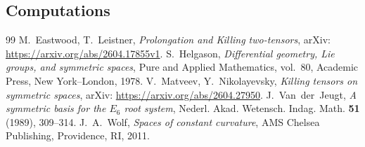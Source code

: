 \documentclass[10pt,a4paper]{amsart}
\newcommand \<{\langle}
\renewcommand \>{\rangle}
\begin{document}
	\subsection{Computations}
	\label{ss:sage}


\begin{thebibliography}{99}
 M.~Eastwood, T.~Leistner, \emph{Prolongation and Killing two-tensors}, arXiv: \url{https://arxiv.org/abs/2604.17855v1}.
 S.~Helgason, \emph{Differential geometry, Lie groups, and symmetric spaces}, Pure and Applied Mathematics, vol.~80, Academic Press, New York--London, 1978.
 V.~Matveev, Y.~Nikolayevsky, \emph{Killing tensors on symmetric spaces}, arXiv: \url{https://arxiv.org/abs/2604.27950}.
 J.~Van~der~Jeugt, \emph{A symmetric basis for the $E_6$ root system}, Nederl. Akad. Wetensch. Indag. Math. \textbf{51} (1989), 309--314.
 J.~A.~Wolf, \emph{Spaces of constant curvature}, AMS Chelsea Publishing, Providence, RI, 2011.
\end{thebibliography}
\end{document}
